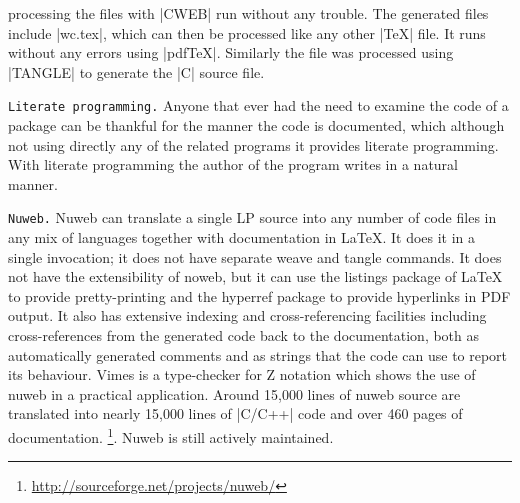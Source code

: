 processing the files with |CWEB| run without any trouble. The generated files include |wc.tex|, which can then be processed like any other |TeX| file. It runs without any errors using |pdfTeX|. Similarly the file was processed using |TANGLE| to generate the |C| source file.


\texttt{Literate programming.} Anyone that ever had the need to examine the code of a \alltex package can be thankful for the manner the code is documented, which although not using directly any of the \web related programs it provides literate programming. With literate programming the author of the program writes in a natural manner.

\texttt{Nuweb.} Nuweb can translate a single LP source into any number of code files in any mix of languages together with documentation in LaTeX. It does it in a single invocation; it does not have separate weave and tangle commands. It does not have the extensibility of noweb, but it can use the listings package of LaTeX to provide pretty-printing and the hyperref package to provide hyperlinks in PDF output. It also has extensive indexing and cross-referencing facilities including cross-references from the generated code back to the documentation, both as automatically generated comments and as strings that the code can use to report its behaviour. Vimes is a type-checker for Z notation which shows the use of nuweb in a practical application. Around 15,000 lines of nuweb source are translated into nearly 15,000 lines of |C/C++| code and over 460 pages of documentation. \footnote{\protect\url{http://sourceforge.net/projects/nuweb/}}. Nuweb is still actively maintained. 




